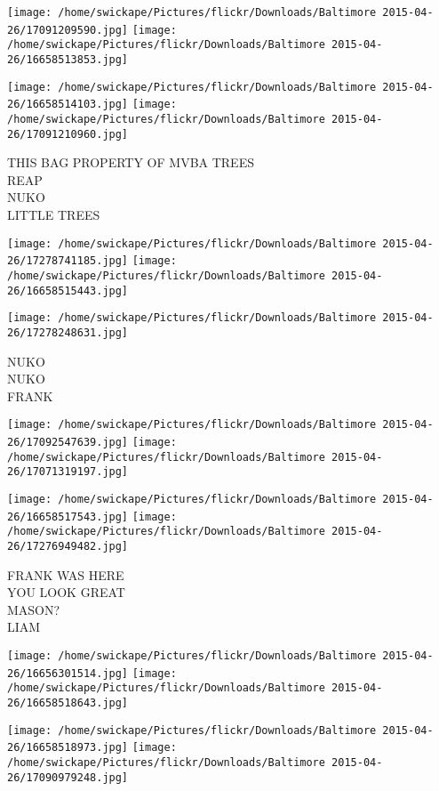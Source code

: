 \documentclass[10pt,letterpaper]{article}
\begin{document}
\texttt{[image: /home/swickape/Pictures/flickr/Downloads/Baltimore 2015-04-26/17091209590.jpg]}
\texttt{[image: /home/swickape/Pictures/flickr/Downloads/Baltimore 2015-04-26/16658513853.jpg]}

\texttt{[image: /home/swickape/Pictures/flickr/Downloads/Baltimore 2015-04-26/16658514103.jpg]}
\texttt{[image: /home/swickape/Pictures/flickr/Downloads/Baltimore 2015-04-26/17091210960.jpg]}

THIS BAG PROPERTY OF MVBA TREES\\
REAP\\
NUKO\\
LITTLE TREES\\
\pagebreak

\texttt{[image: /home/swickape/Pictures/flickr/Downloads/Baltimore 2015-04-26/17278741185.jpg]}
\texttt{[image: /home/swickape/Pictures/flickr/Downloads/Baltimore 2015-04-26/16658515443.jpg]}

\vspace{0.25in}
\texttt{[image: /home/swickape/Pictures/flickr/Downloads/Baltimore 2015-04-26/17278248631.jpg]}

NUKO\\
NUKO\\
FRANK\\
\pagebreak

\texttt{[image: /home/swickape/Pictures/flickr/Downloads/Baltimore 2015-04-26/17092547639.jpg]}
\texttt{[image: /home/swickape/Pictures/flickr/Downloads/Baltimore 2015-04-26/17071319197.jpg]}

\texttt{[image: /home/swickape/Pictures/flickr/Downloads/Baltimore 2015-04-26/16658517543.jpg]}
\texttt{[image: /home/swickape/Pictures/flickr/Downloads/Baltimore 2015-04-26/17276949482.jpg]}

FRANK WAS HERE\\
YOU LOOK GREAT\\
MASON?\\
LIAM\\
\pagebreak

\texttt{[image: /home/swickape/Pictures/flickr/Downloads/Baltimore 2015-04-26/16656301514.jpg]}
\texttt{[image: /home/swickape/Pictures/flickr/Downloads/Baltimore 2015-04-26/16658518643.jpg]}

\texttt{[image: /home/swickape/Pictures/flickr/Downloads/Baltimore 2015-04-26/16658518973.jpg]}
\texttt{[image: /home/swickape/Pictures/flickr/Downloads/Baltimore 2015-04-26/17090979248.jpg]}
\end{document}
